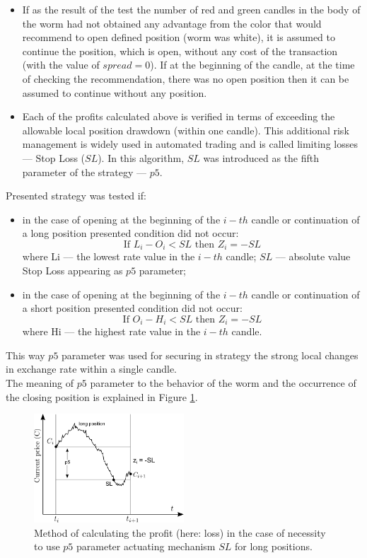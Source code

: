 \documentclass[runningheads,a4paper]{llncs}
\begin{document}
\begin{itemize}
\item If as the result of the test the number of red and green candles in the body of the worm had not obtained any advantage from the color that would recommend to open defined position (worm was white), it is assumed to continue the position, which is open, without any cost of the transaction (with the value of $spread = 0$). If at the beginning of the candle, at the time of checking the recommendation, there was no open position then it can be assumed to continue without any position.
\item Each of the profits calculated above is verified in terms of exceeding the allowable local position drawdown (within one candle). This additional risk management is widely used in automated trading and is called limiting losses --- Stop Loss ($SL$). In this algorithm, $SL$ was introduced as the fifth parameter of the strategy --- $p5$.
\end{itemize}

\noindent Presented strategy was tested if:
\begin{itemize}
\item in the case of opening at the beginning of the $i-th$ candle or continuation of a long position presented condition did not occur:\\
\begin{equation}
\text{If } L_i-O_i<SL \text{ then } Z_i=-SL
\end{equation}
where Li --– the lowest rate value in the $i-th$ candle; $SL$ --– absolute value Stop Loss appearing as $p5$ parameter;
\item in the case of opening at the beginning of the $i-th$ candle or continuation of a short position presented condition did not occur:
\begin{equation}
\text{If } O_i-H_i<SL \text{ then } Z_i=-SL
\end{equation}
where Hi --– the highest rate value in the $i-th$ candle.
\end{itemize}
This way $p5$ parameter was used for securing in strategy the strong local changes in exchange rate within a single candle.\\
The meaning of $p5$ parameter to the behavior of the worm and the occurrence of the closing position is explained in Figure \ref{fig:fig5}.
\begin{figure}[h!]
\centering
\includegraphics[width = 0.5\textwidth]{figures/rys5.png}
\caption{Method of calculating the profit (here: loss) in the case of necessity to use $p5$ parameter actuating mechanism $SL$ for long positions.}
\label{fig:fig5}
\end{figure}
\FloatBarrier
\end{document}
